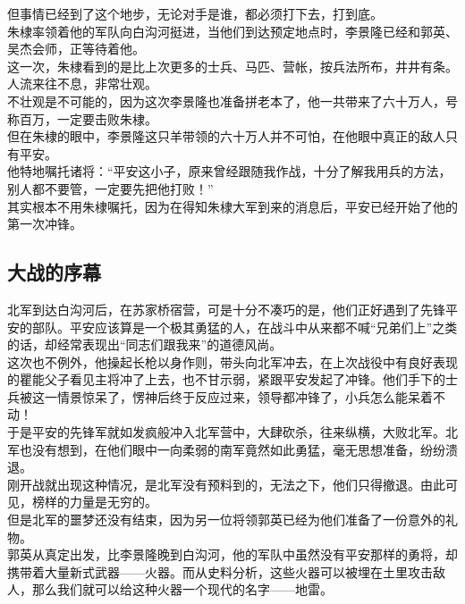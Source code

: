 \begin{multicols}{\theparacolNo}
但事情已经到了这个地步，无论对手是谁，都必须打下去，打到底。\\

朱棣率领着他的军队向白沟河挺进，当他们到达预定地点时，李景隆已经和郭英、吴杰会师，正等待着他。\\

这一次，朱棣看到的是比上次更多的士兵、马匹、营帐，按兵法所布，井井有条。人流来往不息，非常壮观。\\

不壮观是不可能的，因为这次李景隆也准备拼老本了，他一共带来了六十万人，号称百万，一定要击败朱棣。\\

但在朱棣的眼中，李景隆这只羊带领的六十万人并不可怕，在他眼中真正的敌人只有平安。\\

他特地嘱托诸将：“平安这小子，原来曾经跟随我作战，十分了解我用兵的方法，别人都不要管，一定要先把他打败！”\\

其实根本不用朱棣嘱托，因为在得知朱棣大军到来的消息后，平安已经开始了他的第一次冲锋。\\

\subsection{大战的序幕}
北军到达白沟河后，在苏家桥宿营，可是十分不凑巧的是，他们正好遇到了先锋平安的部队。平安应该算是一个极其勇猛的人，在战斗中从来都不喊“兄弟们上”之类的话，却经常表现出“同志们跟我来”的道德风尚。\\

这次也不例外，他操起长枪以身作则，带头向北军冲去，在上次战役中有良好表现的瞿能父子看见主将冲了上去，也不甘示弱，紧跟平安发起了冲锋。他们手下的士兵被这一情景惊呆了，愣神后终于反应过来，领导都冲锋了，小兵怎么能呆着不动！\\

于是平安的先锋军就如发疯般冲入北军营中，大肆砍杀，往来纵横，大败北军。北军也没有想到，在他们眼中一向柔弱的南军竟然如此勇猛，毫无思想准备，纷纷溃退。\\

刚开战就出现这种情况，是北军没有预料到的，无法之下，他们只得撤退。由此可见，榜样的力量是无穷的。\\

但是北军的噩梦还没有结束，因为另一位将领郭英已经为他们准备了一份意外的礼物。\\

郭英从真定出发，比李景隆晚到白沟河，他的军队中虽然没有平安那样的勇将，却携带着大量新式武器——火器。而从史料分析，这些火器可以被埋在土里攻击敌人，那么我们就可以给这种火器一个现代的名字——地雷。\\


\end{multicols}
